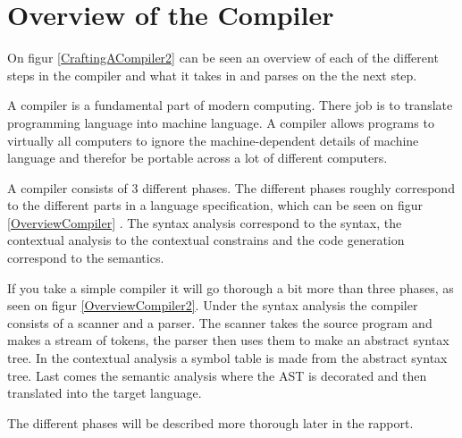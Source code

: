 \section{Overview of the Compiler}


On figur \ref{CraftingACompiler2} can be seen an overview of each of the different steps in the compiler and what it takes in and parses on the the next step.

A compiler is a fundamental part of modern computing. There job is to translate programming language into machine language. A compiler allows programs to virtually all computers to ignore the machine-dependent details of machine language and therefor be portable across a lot of different computers. \citep{CraftingACompiler}


A compiler consists of 3 different phases. The different phases roughly correspond to the different parts in a language specification, which can be seen on figur \ref{OverviewCompiler} . The syntax analysis correspond to the syntax, the contextual analysis to the contextual constrains and the code generation correspond to the semantics.

If you take a simple compiler it will go thorough a bit more than three phases, as seen on figur \ref{OverviewCompiler2}. Under the syntax analysis the compiler consists of a scanner and a parser. The scanner takes the source program and makes a stream of tokens, the parser then uses them to make an abstract syntax tree. In the contextual analysis a symbol table is made from the abstract syntax tree. Last comes the semantic analysis where the AST is decorated and then translated into the target language.

The different phases will be described more thorough later in the rapport. 